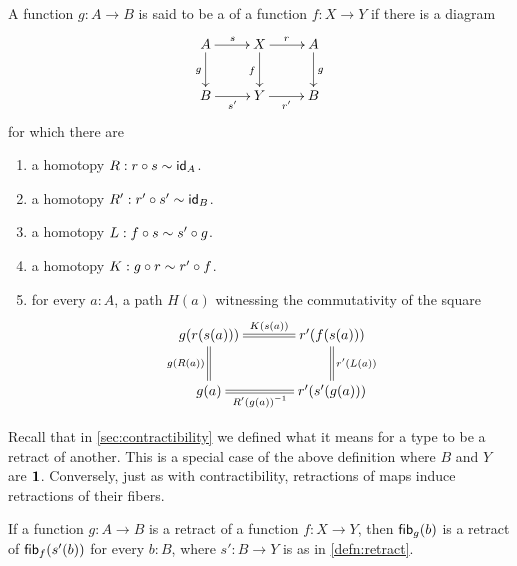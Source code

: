 \begin{defn}\label{defn:retract}
A function $g:A\to B$ is said to be a 
of a function $f:X\to Y$ if there is a diagram
\begin{equation*}
  \xymatrix{
    {A} \ar[r]^{s} \ar[d]_{g}
    &
    {X} \ar[r]^{r} \ar[d]_{f}
    &
    {A} \ar[d]^{g}
    \\
    {B} \ar[r]_{s'}
    &
    {Y} \ar[r]_{r'}
    &
    {B}
  }
\end{equation*}
for which there are
\begin{enumerate}
\item a homotopy $R:r\circ s \htpy \idfunc[A]$.
\item a homotopy $R':r'\circ s' \htpy\idfunc[B]$.
\item a homotopy $L:f\circ s\htpy s'\circ g$.
\item a homotopy $K:g\circ r\htpy r'\circ f$.
\item for every $a:A$, a path $H(a)$ witnessing the commutativity of the square
\begin{equation*}
  \xymatrix@C=3pc{
    {g(r(s(a)))} \ar@{=}[r]^-{K(s(a))} \ar@{=}[d]_{\ap g{R(a)}}
    &
    {r'(f(s(a)))} \ar@{=}[d]^{\ap{r'}{L(a)}}
    \\
    {g(a)} \ar@{=}[r]_-{\opp{R'(g(a))}}
    &
    {r'(s'(g(a)))}
  }
\end{equation*}
\end{enumerate}
\end{defn}

Recall that in \autoref{sec:contractibility} we defined what it means for a type to be a retract of another.
This is a special case of the above definition where $B$ and $Y$ are $\unit$.
Conversely, just as with contractibility, retractions of maps induce retractions of their fibers.

\begin{lem}\label{lem:func_retract_to_fiber_retract}
If a function $g:A\to B$ is a retract of a function $f:X\to Y$, then $\hfib{g}b$ is a retract of $\hfib{f}{s'(b)}$
for every $b:B$, where $s':B\to Y$ is as in \autoref{defn:retract}.
\end{lem}

